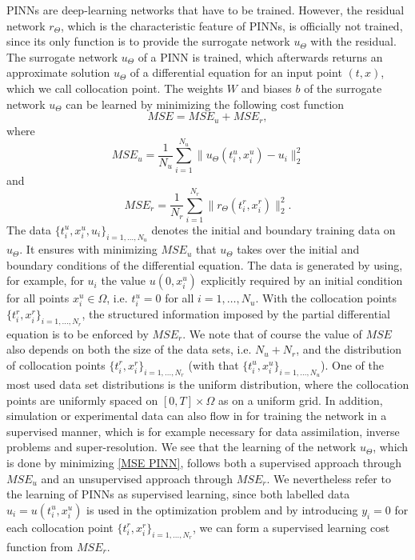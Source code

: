 PINNs are deep-learning networks that have to be trained. However, the residual network $r_\Theta$, which is the characteristic feature of PINNs, is officially not trained, since its only function is to provide the surrogate network $u_\Theta$ with the residual. The surrogate network $u_\Theta$ of a PINN is trained, which afterwards returns an approximate solution $u_\Theta$ of a differential equation for an input point $(t,x)$, which we call collocation point. The weights $W$ and biases $b$ of the surrogate network $u_\Theta$ can be learned by minimizing the following cost function
\begin{equation}
    \label{MSE PINN}
    MSE = MSE_u + MSE_r, 
\end{equation}
where
\begin{equation*}
    MSE_u = \frac{1}{N_u} \sum^{N_u}_{i = 1} \lVert u_\Theta(t^{u}_i, x^{u}_i) - u_i \rVert^{2}_{2}
\end{equation*}
and
\begin{equation*}
    MSE_r = \frac{1}{N_r} \sum^{N_r}_{i = 1} \lVert r_\Theta (t^{r}_i, x^{r}_i) \rVert^{2}_{2}.
\end{equation*}
The data $\{t^{u}_i, x^{u}_i, u_i \}_{i = 1, \ldots, N_u}$ denotes the initial and boundary training data on $u_\Theta$. It ensures with minimizing $MSE_u$ that $u_\Theta$ takes over the initial and boundary conditions of the differential equation. The data is generated by using, for example, for $u_i$ the value $u(0,x^{u}_i)$ explicitly required by an initial condition for all points $x^{u}_i \in \Omega$, i.e. $t^{u}_i = 0$ for all $i = 1, \ldots, N_u$. With the collocation points $\{t^{r}_i, x^{r}_i \}_{i = 1, \ldots, N_r}$, the structured information imposed by the partial differential equation is to be enforced by $MSE_r$. We note that of course the value of $MSE$ also depends on both the size of the data sets, i.e. $N_u + N_r$, and the distribution of collocation points $\{t^{r}_i, x^{r}_i \}_{i = 1, \ldots, N_r}$ (with that $\{t^{u}_i, x^{u}_i \}_{i = 1, \ldots, N_u}$). One of the most used data set distributions is the uniform distribution, where the collocation points are uniformly spaced on $\left[ 0, T \right] \times \Omega$ as on a uniform grid. In addition, simulation or experimental data can also flow in for training the network in a supervised manner, which is for example necessary for data assimilation, inverse problems and super-resolution. We see that the learning of the network $u_\Theta$, which is done by minimizing \cref{MSE PINN}, follows both a supervised approach through $MSE_u$ and an unsupervised approach through $MSE_r$. We nevertheless refer to the learning of PINNs as supervised learning, since both labelled data $u_i = u(t^{u}_i, x^{u}_i)$ is used in the optimization problem and by introducing $y_i=0$ for each collocation point $\{t^{r}_i, x^{r}_i \}_{i = 1, \ldots, N_r}$, we can form a supervised learning cost function from $MSE_r$. \\
